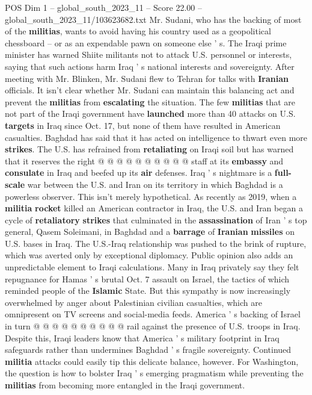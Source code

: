 \begin{textsample}{POS Dim 1 – global\_south\_2023\_11 – Score 22.00 – global\_south\_2023\_11/103623682.txt}
Mr.
Sudani, who has the backing of most of the \textbf{militias}, wants to avoid having his country used as a geopolitical chessboard -- or as an expendable pawn on someone else ' s.
The Iraqi prime minister has warned Shiite militants not to attack U.S. personnel or interests, saying that such actions harm Iraq ' s national interests and sovereignty.
After meeting with Mr.
Blinken, Mr.
Sudani flew to Tehran for talks with \textbf{Iranian} officials.
It isn't clear whether Mr.
Sudani can maintain this balancing act and prevent the \textbf{militias} from \textbf{escalating} the situation.
The few \textbf{militias} that are not part of the Iraqi government have \textbf{launched} more than 40 attacks on U.S. \textbf{targets} in Iraq since Oct. 17, but none of them have resulted in American casualties.
Baghdad has said that it has acted on intelligence to thwart even more \textbf{strikes}.
The U.S. has refrained from \textbf{retaliating} on Iraqi soil but has warned that it reserves the right @ @ @ @ @ @ @ @ @ @ staff at its \textbf{embassy} and \textbf{consulate} in Iraq and beefed up its \textbf{air} defenses.
Iraq ' s nightmare is a \textbf{full-scale} war between the U.S. and Iran on its territory in which Baghdad is a powerless observer.
This isn't merely hypothetical.
As recently as 2019, when a \textbf{militia} \textbf{rocket} killed an American contractor in Iraq, the U.S. and Iran began a cycle of \textbf{retaliatory} \textbf{strikes} that culminated in the \textbf{assassination} of Iran ' s top general, Qasem Soleimani, in Baghdad and a \textbf{barrage} of \textbf{Iranian} \textbf{missiles} on U.S. bases in Iraq.
The U.S.-Iraq relationship was pushed to the brink of rupture, which was averted only by exceptional diplomacy.
Public opinion also adds an unpredictable element to Iraqi calculations.
Many in Iraq privately say they felt repugnance for Hamas ' s brutal Oct. 7 assault on Israel, the tactics of which reminded people of the \textbf{Islamic} State.
But this sympathy is now increasingly overwhelmed by anger about Palestinian civilian casualties, which are omnipresent on TV screens and social-media feeds.
America ' s backing of Israel in turn @ @ @ @ @ @ @ @ @ @ rail against the presence of U.S. troops in Iraq.
Despite this, Iraqi leaders know that America ' s military footprint in Iraq safeguards rather than undermines Baghdad ' s fragile sovereignty.
Continued \textbf{militia} attacks could easily tip this delicate balance, however.
For Washington, the question is how to bolster Iraq ' s emerging pragmatism while preventing the \textbf{militias} from becoming more entangled in the Iraqi government.

\end{textsample}
